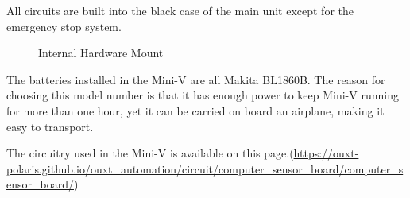 \documentclass[lettersize,journal]{IEEEtran}
\begin{document}
All circuits are built into the black case of the main unit except for the emergency stop system.

\begin{figure}[H]
  \begin{center}
  \end{center}
  \caption{Internal Hardware Mount}
  \label{fig:internal_hardware_mount}
\end{figure}

The batteries installed in the Mini-V are all Makita BL1860B.
The reason for choosing this model number is that it has enough power to keep Mini-V running for more than one hour, yet it can be carried on board an airplane, making it easy to transport.

The circuitry used in the Mini-V is available on this page.(\url{https://ouxt-polaris.github.io/ouxt_automation/circuit/computer_sensor_board/computer_sensor_board/})
\end{document}
